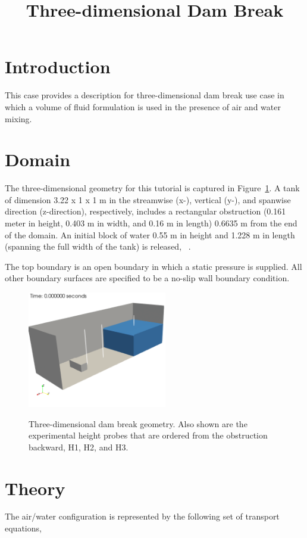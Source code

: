\documentclass{article}
\title{Three-dimensional Dam Break}
\date{}
\begin{document}
\maketitle

\section{Introduction}
This case provides a description for three-dimensional dam break
use case in which a volume of fluid formulation is used in the presence
of air and water mixing.

\section{Domain}
The three-dimensional geometry for this tutorial is captured in 
Figure~\ref{fig:geom}. A tank of dimension 3.22 x 1 x 1 m in the 
streamwise (x-), vertical (y-), and spanwise direction (z-direction), 
respectively, includes 
a rectangular obstruction (0.161 meter in height, 
0.403 m in width, and 0.16 m in length) 0.6635 m from the end of the domain. 
An initial block of water 0.55 m in height and 1.228 m in length 
(spanning the full width of the tank) is released, ~\cite{kleefsman2005}.

The top boundary is an open boundary in which a static 
pressure is supplied. All other boundary surfaces are specified to
be a no-slip wall boundary condition. 

\begin{figure}[!htbp]
  \centering
  {
   \includegraphics[height=2.0in]{images/3d_hex8_dam_break_geom.png}
  }
  \caption{Three-dimensional dam break geometry. Also shown are the experimental height probes that
are ordered from the obstruction backward, H1, H2, and H3.}
  \label{fig:geom}
\end{figure}

\section{Theory}
The air/water configuration is represented by the following set of 
transport equations,
\end{document}
